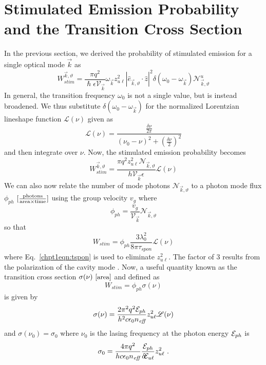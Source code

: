 \documentclass[12pt]{report}
\begin{document}
\section{Stimulated Emission Probability and the Transition Cross Section}
In the previous section, we derived the probability of stimulated emission for a single optical mode $\vec{k}$ as
\begin{equation}
W_\textit{stim}^{\vec{k},\vartheta} = \frac{\pi q^2}{\hslash \epsilon \mathcal{V}_{\vec{k}}} \omega_{\vec{k}}
z_{u\ell}^2
|\hat{e}_{\vec{k},\vartheta} \cdot \hat{z} |^2  \delta(\omega_0-\omega_{\vec{k}}) \mathcal{N}_{\vec{k},\vartheta}^u
\end{equation}
In general, the transition frequency $\omega_0$ is not a single value, but is instead broadened.  We thus substitute $\delta(\omega_0-\omega_{\vec{k}})$ for the normalized Lorentzian lineshape function $\mathscr{L}(\nu)$ given as
\begin{equation}
\mathscr{L}(\nu)=\frac{\frac{\delta\!\nu}{2\pi}}{(\nu_0-\nu)^2+\left(\frac{\delta\!\nu}{2} \right)^2} %
\end{equation}
and then integrate over $\nu$.  Now, the stimulated emission probability becomes \cite{Yariv:book:1989}
\begin{equation}
W_\textit{stim}^{\vec{k},\vartheta}=\frac{\pi q^2 z_{u\ell}^2 \mathcal{N}_{\vec{k},\vartheta}}{h \mathcal{V}_{\vec{k}} \epsilon} \mathscr{L}(\nu)
\end{equation}
We can also now relate the number of mode photons $\mathcal{N}_{\vec{k},\vartheta}$ to a photon mode flux $\phi_{ph}$ $[\frac{\textnormal{photons}}{\textnormal{area}\times\textnormal{time}}]$ using the group velocity $v_g$ where
\begin{equation}
\phi_{ph} = \frac{v_g}{\mathcal{V}_{\vec{k}}} \mathcal{N}_{\vec{k},\vartheta}
\end{equation}
so that \cite{Yariv:book:1989}
\begin{equation}
W_\textit{stim} = \phi_{ph} \frac{3 \lambda_0^2}{8 \pi \tau_\textit{spon}} \mathscr{L}(\nu)
\end{equation}
where Eq.~\eqref{chpt1eqn:tspon} is used to eliminate $z_{u\ell}^2$.  The factor of 3 results from the polarization of the cavity mode \cite{Siegman:book:1986}.  Now, a useful quantity known as the transition cross section $\sigma(\nu)~[\small{\textnormal{area}}]$ and defined as \cite{SalehTeich:book:1991}
\begin{equation}
W_\textit{stim}=\phi_{ph} \sigma(\nu)
\end{equation}
is given by
\begin{equation}
\sigma(\nu) = \frac{2 \pi^2 q^2 \EE_{ph}}{h^2 c \epsilon_0 n_\textit{eff}} z_{u\ell}^2 \mathscr{L}(\nu)
\end{equation}
and $\sigma(\nu_0)=\sigma_0$ where $\nu_0$ is the lasing frequency at the photon energy $\EE_{ph}$ is
\begin{equation}
\sigma_0 = \frac{4 \pi q^2}{h c \epsilon_0 n_\textit{eff}} \frac{\EE_{ph}}{\delta\!\EE_{u\ell}} z_{u\ell}^2 \tn{~.}
\end{equation}
\end{document}
